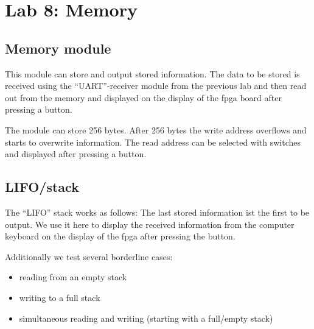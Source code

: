 \chapter{Lab 8: Memory} \label{day8}

\section{Memory module}

This module can store and output stored information. The data to be stored is received using the ``UART''-receiver module from the previous lab and then read out from the memory and displayed on the display of the \gls{fpga} board after pressing a button. 

The module can store 256 bytes. After 256 bytes the write address overflows and starts to overwrite information. The read address can be selected with switches and displayed after pressing a button.





\section{LIFO/stack}

The ``LIFO'' stack works as follows: The last stored information ist the first to be output. We use it here to display the received information from the computer keyboard on the display of the \gls{fpga} after pressing the button.







Additionally we test several borderline cases: 

\begin{itemize}
    \item reading from an empty stack
    \item writing to a full stack
    \item simultaneous reading and writing (starting with a full/empty stack)
\end{itemize}

